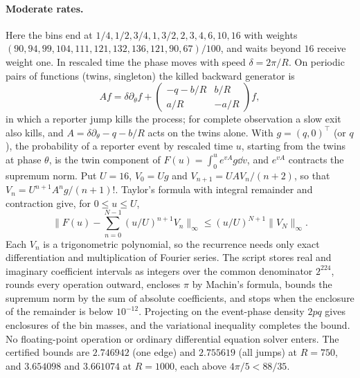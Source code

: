 \paragraph{Moderate rates.} Here the bins end at $1/4,1/2,3/4,1,3/2,2,3,4,6,10,16$ with weights $(90,94,99,104,111,121,132,136,121,90,67)/100$, and waits beyond $16$ receive weight one. In rescaled time the phase moves with speed $\delta=2\pi/R$. On periodic pairs of functions (twins, singleton) the killed backward generator is
\[
 A f = \delta\partial_\theta f+
 \begin{pmatrix}-q-b/R & b/R\\ a/R&-a/R\end{pmatrix} f ,
\]
in which a reporter jump kills the process; for complete observation a slow exit also kills, and $A=\delta\partial_\theta-q-b/R$ acts on the twins alone. With $g=(q,0)^{\top}$ (or $q$), the probability of a reporter event by rescaled time $u$, starting from the twins at phase $\theta$, is the twin component of $F(u)=\int_0^u e^{vA}g\dd v$, and $e^{vA}$ contracts the supremum norm. Put $U=16$, $V_0=Ug$ and $V_{n+1}=U A V_n/(n+2)$, so that $V_n=U^{n+1}A^n g/(n+1)!$. Taylor's formula with integral remainder and contraction give, for $0\le u\le U$,
\[
 \Big\|F(u)-\sum_{n=0}^{N-1}(u/U)^{n+1}V_n\Big\|_\infty
 \le (u/U)^{N+1}\|V_N\|_\infty .
\]
Each $V_n$ is a trigonometric polynomial, so the recurrence needs only exact differentiation and multiplication of Fourier series. The script stores real and imaginary coefficient intervals as integers over the common denominator $2^{224}$, rounds every operation outward, encloses $\pi$ by Machin's formula, bounds the supremum norm by the sum of absolute coefficients, and stops when the enclosure of the remainder is below $10^{-12}$. Projecting on the event-phase density $2pq$ gives enclosures of the bin masses, and the variational inequality completes the bound. No floating-point operation or ordinary differential equation solver enters. The certified bounds are $2.746942$ (one edge) and $2.755619$ (all jumps) at $R=750$, and $3.654098$ and $3.661074$ at $R=1000$, each above $4\pi/5<88/35$.
